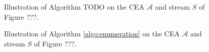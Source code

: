 \begin{figure}[H]
  \centering
  \begin{subfigure}[t]{0.1\linewidth}
  \end{subfigure}
  \begin{subfigure}[t]{0.1\linewidth}
  \end{subfigure}
  \begin{subfigure}[t]{0.24\linewidth}
  \end{subfigure}
  \begin{subfigure}[t]{0.24\linewidth}
  \end{subfigure}
  \begin{subfigure}[t]{0.28\linewidth}
  \end{subfigure}
  \caption{Illustration of Algorithm TODO on the CEA $\mathcal{A}$ and stream $S$ of Figure ???.}
  \label{fig:label}
\end{figure}

\begin{figure}[H]
  \centering
  \begin{subfigure}[t]{0.24\linewidth}
  \end{subfigure}
  \begin{subfigure}[t]{0.24\linewidth}
  \end{subfigure}
  \begin{subfigure}[t]{0.24\linewidth}
  \end{subfigure}
  \begin{subfigure}[t]{0.24\linewidth}
  \end{subfigure}
  \caption{Illustration of Algorithm \ref{algo:enumeration} on the CEA $\mathcal{A}$ and stream $S$ of Figure ???.}
  \label{fig:label}
\end{figure}


